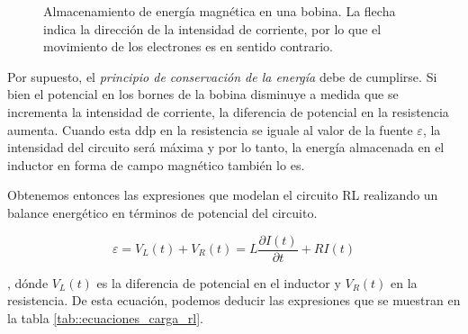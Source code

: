 \documentclass[../main.tex]{subfiles}
\begin{document}
\begin{figure}[!h]
    \centering
    \caption{Almacenamiento de energía magnética en una bobina. La flecha indica la dirección de la intensidad de corriente, por lo que el movimiento de los electrones es en sentido contrario.}
    \label{fig::carga_bobina}
\end{figure}

Por supuesto, el \textit{principio de conservación de la energía} debe de cumplirse. Si bien el potencial en los bornes de la bobina disminuye a medida que se incrementa la intensidad de corriente, la diferencia de potencial en la resistencia aumenta. Cuando esta ddp en la resistencia se iguale al valor de la fuente $\varepsilon$, la intensidad del circuito será máxima y por lo tanto, la energía almacenada en el inductor en forma de campo magnético también lo es.

Obtenemos entonces las expresiones que modelan el circuito RL realizando un balance energético en términos de potencial del circuito.


\begin{equation}
    \label{eqq::carga_bobina}
    \varepsilon = V_L(t) + V_R(t) = L \frac{\partial I(t)}{\partial t} + R I(t)
\end{equation}

, dónde $V_L(t)$ es la diferencia de potencial en el inductor y $V_R(t)$ en la resistencia. De esta ecuación, podemos deducir las expresiones que se muestran en la tabla \ref{tab::ecuaciones_carga_rl}.\\
\end{document}
